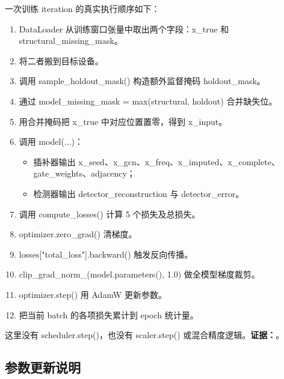 \documentclass[11pt,a4paper]{ctexart}
\newcommand{\code}[1]{{\ttfamily\small #1}}
\newcommand{\evidence}[1]{\textbf{证据：}#1}
\begin{document}
一次训练 iteration 的真实执行顺序如下：
\begin{enumerate}
  \item DataLoader 从训练窗口张量中取出两个字段：\code{x\_true} 和 \code{structural\_missing\_mask}。
  \item 将二者搬到目标设备。
  \item 调用 \code{sample\_holdout\_mask()} 构造额外监督掩码 \code{holdout\_mask}。
  \item 通过 \code{model\_missing\_mask = max(structural, holdout)} 合并缺失位。
  \item 用合并掩码把 \code{x\_true} 中对应位置置零，得到 \code{x\_input}。
  \item 调用 \code{model(...)}：
  \begin{itemize}
    \item 插补器输出 \code{x\_seed}、\code{x\_gcn}、\code{x\_freq}、\code{x\_imputed}、\code{x\_complete}、\code{gate\_weights}、\code{adjacency}；
    \item 检测器输出 \code{detector\_reconstruction} 与 \code{detector\_error}。
  \end{itemize}
  \item 调用 \code{compute\_losses()} 计算 5 个损失及总损失。
  \item \code{optimizer.zero\_grad()} 清梯度。
  \item \code{losses["total\_loss"].backward()} 触发反向传播。
  \item \code{clip\_grad\_norm\_(model.parameters(), 1.0)} 做全模型梯度裁剪。
  \item \code{optimizer.step()} 用 AdamW 更新参数。
  \item 把当前 batch 的各项损失累计到 epoch 统计量。
\end{enumerate}

这里没有 \code{scheduler.step()}，也没有 \code{scaler.step()} 或混合精度逻辑。\evidence{。}

\subsection{参数更新说明}
\end{document}
